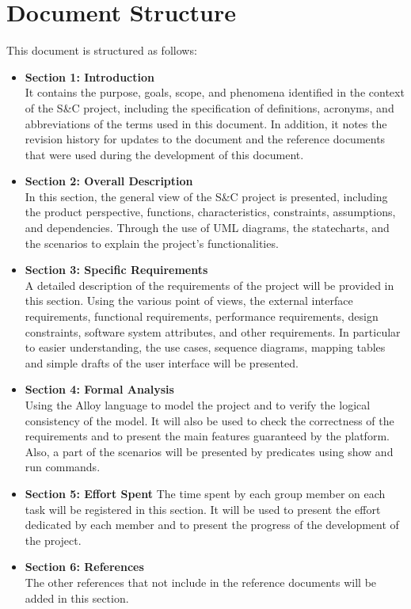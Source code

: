 \section{Document Structure}\label{sec:structure}
This document is structured as follows:
\begin{itemize}
    \item \textbf{Section 1: Introduction} 
    \\It contains the purpose, goals, scope, and phenomena identified in the context of the S\&C project, 
    including the specification of definitions, acronyms, and abbreviations of the terms used in this document. In addition, it notes the revision 
    history for updates to the document and the reference documents that were used during the development of this document.
    \item \textbf{Section 2: Overall Description}
    \\ In this section, the general view of the S\&C project is presented, including the product perspective, functions, characteristics, 
    constraints, assumptions, and dependencies. Through the use of UML diagrams, the statecharts, and the scenarios to explain the project's 
    functionalities.
    \item \textbf{Section 3: Specific Requirements}
    \\ A detailed description of the requirements of the project will be provided in this section. Using the various point of views, the external   
    interface requirements, functional requirements, performance requirements, design constraints, software system attributes, and other 
    requirements. In particular to easier understanding, the use cases, sequence diagrams, mapping tables and simple drafts of the user interface 
    will be presented.
    \item \textbf{Section 4: Formal Analysis}
    \\ Using the Alloy language to model the project and to verify the logical consistency of the model. It will also be used to check the
    correctness of the requirements and to present the main features guaranteed by the platform. Also, a part of the scenarios will be presented 
    by predicates using show and run commands.
    \item \textbf{Section 5: Effort Spent}
    The time spent by each group member on each task will be registered in this section. It will be used to present the effort dedicated 
    by each member and to present the progress of the development of the project.
    \item \textbf{Section 6: References}
    \\ The other references that not include in the reference documents will be added in this section.
\end{itemize}
